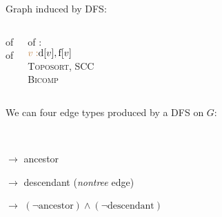 
\begin{frame}{} 
  \centerline{\large Graph  induced by DFS:}

  \vspace{0.50cm}
  \begin{columns}
      \begin{center}
	 of  \\[15pt]

	 of 
      \end{center}
    \pause
      \begin{center}
	 of : \\[15pt]

	$\textcolor{brown}{v:} \text{d}[v], \text{f}[v]$ \\[10pt]

	 \textsc{Toposort}, \textsc{SCC} \\[10pt]

	 \textsc{Bicomp} {\footnotesize {}}
      \end{center}
  \end{columns}
\end{frame}

\begin{frame}{}
  \begin{definition}
    We can  four edge types  produced by a DFS on $G$:
    \begin{description}
      \setlength{\itemsep}{5pt}
      \item[Tree edge:]  \\[12pt]
      \item[Back edge:] $\to$ ancestor
      \item[Forward edge:] $\to$ descendant {\small ({\it nontree} edge)}
      \item[Cross edge:] $\to$ $(\lnot \text{ancestor}) \land (\lnot \text{descendant})$
    \end{description}
  \end{definition}

\end{frame}

